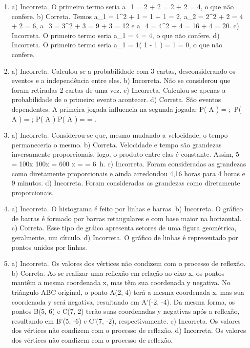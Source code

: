 \begin{enumerate}
\item a) Incorreta. O primeiro termo seria
a_{1} = 2  + 2 = 2 + 2 = 4, o que não confere.
b) Correta. Temos a_{1} = 1^{2} + 1 = 1 + 1 = 2,
a_{2} = 2^{2} + 2 = 4 + 2 = 6, a_{3} = 3^{2} + 3 = 9 + 3 = 12 e a_{4} = 4^2 + 4 = 16 + 4 = 20.
c) Incorreta. O primeiro termo seria a_{1} = 4  = 4, o que não confere.
d) Incorreta. O primeiro termo seria
a_{1} = 1\left( 1 - 1 \right) = 1  = 0, o que não confere.


\item a) Incorreta. Calculou-se a probabilidade com 3 cartas, desconsiderando os eventos e a independência entre eles.
b) Incorreta. Não se considerou que foram retiradas 2 cartas de uma vez.
c) Incorreta. Calculou-se apenas a probabilidade de o primeiro evento acontecer.
d) Correta. São eventos dependentes. A primeira jogada influencia na segunda jogada: P\left( A \right) = ;\ P\left( A \right) = ; P\left( A \right) \times P\left( A \right) =  \times {} = .


\item a) Incorreta. Considerou-se que, mesmo mudando a velocidade, o tempo permaneceria o mesmo.
b) Correta. Velocidade e tempo são grandezas inversamente proporcionais, logo, o produto entre elas é constante. Assim,
5  = 100x \rightarrow 100x = 600 \rightarrow x =  = 6\ h.
c) Incorreta. Foram consideradas as grandezas como diretamente proporcionais e ainda arredondou 4,16 horas para 4 horas e 9 minutos.
d) Incorreta. Foram consideradas as grandezas como diretamente proporcionais.


\item a) Incorreta. O histograma é feito por linhas e barras.
b) Incorreta. O gráfico de barras é formado por barras
retangulares e com base maior na horizontal.
c) Correta. Esse tipo de gráico apresenta setores de uma figura geométrica, geralmente, um círculo.
d) Incorreta. O gráfico de linhas é representado por pontos unidos por linhas.


\item a) Incorreta. Os valores dos vértices não condizem com o processo de reflexão.
b) Correta. Ao se realizar uma reflexão em relação ao eixo x, os pontos mantêm a mesma coordenada x, mas têm sua coordenada y negativa.
No triângulo ABC original, o ponto A(2, 4) terá a mesma coordenada x, mas sua coordenada y será negativa, resultando em A'(-2, -4). Da mesma
forma, os pontos B(5, 6) e C(7, 2) terão suas coordenadas y negativas
após a reflexão, resultando em B'(5, -6) e C'(7, -2), respectivamente.
c) Incorreta. Os valores dos vértices não condizem com o processo de reflexão.
d) Incorreta. Os valores dos vértices não condizem com o processo de reflexão.
\end{enumerate}

